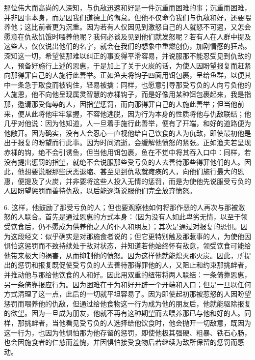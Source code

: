 那位伟大而高尚的人深知，与仇敌迅速和好是一件沉重而困难的事；沉重而困难，并非因事本身，而是因我们道德上的懈怠。但他不仅命令我们与仇敌和好，还要喂养他；这比前者更为沉重。因为若有人仅因见到激怒自己的人就怒不可遏，又怎会愿意在仇敌饥饿时喂养他呢？我何必谈及见到他们就发怒呢？若有人在人群中提及这些人，仅仅说出他们的名字，就会在我们的想象中重燃创伤，加剧情感的狂热。深知这一切，希望使那难以纠正的事变得平滑容易，并说服那不能忍受见到仇敌的人，预备好施行上述的恩惠，于是加上了关于火炭的话，为使人因盼望报复而赶紧向那得罪自己的人施行此善举。正如渔夫将钩子四面用饵包裹，呈给鱼群，以便其中一条急于取食而被钩住，轻易被擒：同样，也愿意引导那受亏负的人向亏负他的人施恩，他不向他呈现属灵智慧的赤裸钩子，而是好像用某种饵包裹起来，我是指那，邀请那受侮辱的人，因指望惩罚，而向那得罪自己的人施此善举；但当他前来，便从此将他牢牢掌握，不容他逃脱，因为行为本身的性质将他与仇敌联结；他几乎对他说：因为他知道，人一旦着手施行此善举，便有了开端，和好的道路便为他敞开。因为确实，没有人会忍心一直视他给自己饮食的人为仇敌，即使最初他是出于报复的盼望而行此事。因为时间流逝，会缓解他愤怒的紧张。正如渔夫若呈现赤裸的钩，绝不会引诱鱼，但当他用饵包裹，鱼在不觉中将其吞入口中：同样，若没有提出惩罚的指望，就绝不会说服那些受亏负的人去善待那些得罪他们的人。因此，他想要说服那些厌恶退缩、甚至见到仇敌就瘫痪的人，向他们施行最大的恩惠，便提及了火炭，并非要将这些人投入无情的惩罚，而是为使他先说服受亏负的人因盼望惩罚而善待仇敌，以后能逐渐说服他们完全放弃愤怒。\par

6. 这样，他鼓励了那受亏负的人；但也要观察他如何将那作恶的人再次与那被激怒的人联合。首先是通过恩惠的方式本身：（因为没有人如此卑劣无情，以至于领受饮食后，仍不愿成为供养他之人的仆人和朋友）；其次是通过对报复的恐惧。因为这段经文：似乎确实是对那施食者说的；但它更特别触及那惹事的人，为使他因惧怕这惩罚而不致持续处于敌对状态，并知道若他始终怀有敌意，领受饮食可能给他带来极大的祸害，从而抑制他的愤怒。因为这样他就能熄灭那火炭。因此，所提出的惩罚和报复既促使受亏负的人去善待那得罪他的人，又阻止和约束那挑衅者，并推动他与那给他饮食的人和好。因此用双重的纽带将两人联结：一条倚靠恩惠，另一条倚靠报应行为。因为困难在于为和好开辟一个开端和入口；但是一旦以任何方式清理了这一点，此后的一切就平坦容易了。因为即使起初那被惹怒的人因盼望惩罚而喂养他的仇敌，但通过给他食物这一行为成为他的朋友后，他就能驱除报复的欲望。因为一旦成为朋友，他就不再有这种期望而去喂养那已与他和好的人。同样，那挑衅者，当他看见受亏负的人选择给他饮食时，他会抛开一切敌意，既因为这一行为，也因为他惧怕那为他存留的惩罚，即使他极其强硬、粗暴、铁石心肠，也会因施食者的仁慈而羞愧，并因惧怕接受食物后若继续为敌所保留的惩罚而感动。\par

